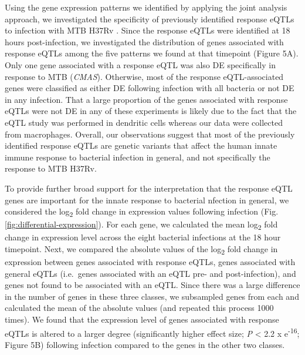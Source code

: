 Using the gene expression patterns we identified by applying the joint
analysis approach, we investigated the specificity of previously
identified response eQTLs to infection with MTB H37Rv
\citep{Barreiro2012}. Since the response eQTLs were identified at 18
hours post-infection, we investigated the distribution of genes
associated with response eQTLs among the five patterns we found at that
timepoint (Figure 5A). Only one gene associated with a response eQTL was
also DE specifically in response to MTB (\emph{CMAS}). Otherwise, most
of the response eQTL-associated genes were classified as either DE
following infection with all bacteria or not DE in any infection. That a
large proportion of the genes associated with response eQTLs were not DE
in any of these experiments is likely due to the fact that the eQTL
study was performed in dendritic cells whereas our data were collected
from macrophages. Overall, our observations suggest that most of the
previously identified response eQTLs are genetic variants that affect
the human innate immune response to bacterial infection in general, and
not specifically the response to MTB H37Rv.

To provide further broad support for the interpretation that the
response eQTL genes are important for the innate response to bacterial
nfection in general, we considered the log\textsubscript{2} fold change
in expression values following infection (Fig. \ref{fig:differential-expression}). For each gene, we
calculated the mean log\textsubscript{2} fold change in expression level
across the eight bacterial infections at the 18 hour timepoint. Next, we
compared the absolute values of the log\textsubscript{2} fold change in
expression between genes associated with response eQTLs, genes
associated with general eQTLs (i.e.~genes associated with an eQTL pre-
and post-infection), and genes not found to be associated with an eQTL.
Since there was a large difference in the number of genes in these three
classes, we subsampled genes from each and calculated the mean of the
absolute values (and repeated this process 1000 times). We found that
the expression level of genes associated with response eQTLs is altered
to a larger degree (significantly higher effect size; \emph{P}
\textless{} 2.2 x e\textsuperscript{-16}; Figure 5B) following infection
compared to the genes in the other two classes.

